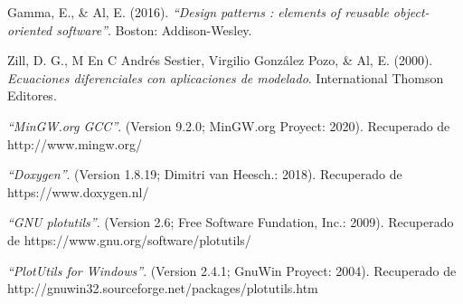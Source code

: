 \documentclass[a4paper]{article}
\begin{document}
\begin{thebibliography}{9}

Gamma, E., \& Al, E. (2016). 
\textit{``Design patterns : elements of reusable object-oriented 
software''}. Boston: Addison-Wesley.

Zill, D. G., M En C Andrés Sestier, Virgilio González Pozo, \& Al, E. (2000).
\textit{Ecuaciones diferenciales con aplicaciones de modelado}.
International Thomson Editores.

\textit{``MinGW.org GCC''}. 
(Version 9.2.0; MinGW.org Proyect: 2020).
Recuperado de http://www.mingw.org/

\textit{``Doxygen''}. 
(Version 1.8.19; Dimitri van Heesch.: 2018).
Recuperado de https://www.doxygen.nl/

\textit{``GNU plotutils''}.
(Version 2.6; Free Software Fundation, Inc.: 2009).
Recuperado de https://www.gnu.org/software/plotutils/

\textit{``PlotUtils for Windows''}.
(Version 2.4.1; GnuWin Proyect: 2004).
Recuperado de http://gnuwin32.sourceforge.net/packages/plotutils.htm

\end{thebibliography}
\end{document}
